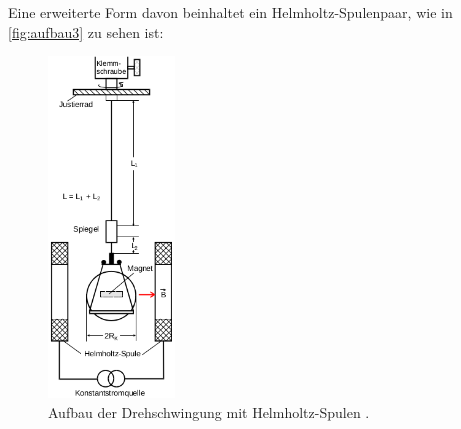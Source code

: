 Eine erweiterte Form davon beinhaltet ein Helmholtz-Spulenpaar, wie in \autoref{fig:aufbau3} zu sehen ist:
\begin{figure}
    \centering
    \includegraphics[width=0.3\textwidth]{content/Bilder/Magnet.png}
    \caption{Aufbau der Drehschwingung mit Helmholtz-Spulen \cite{v102}.}
    \label{fig:aufbau3}
\end{figure}